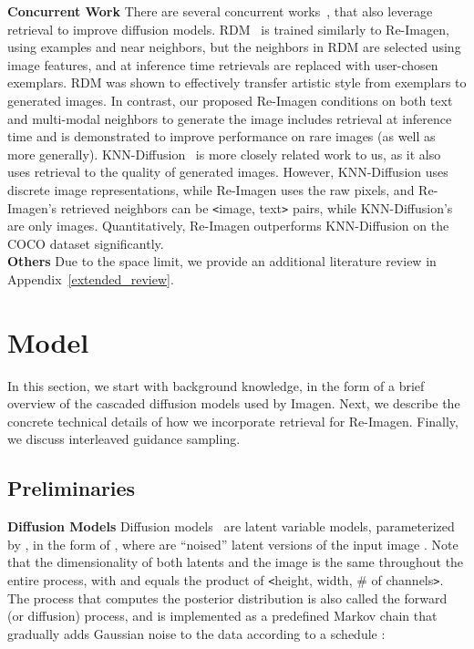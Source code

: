 \documentclass{article} \usepackage{iclr2023_conference,times}
\newcommand{\modelname}{{Re-Imagen}\xspace}
\begin{document}
\noindent \textbf{Concurrent Work} There are several concurrent works~\citep{li2022memory,blattmann2022retrieval,ashual2022knn}, that also leverage retrieval to improve diffusion models.  RDM~\citep{blattmann2022retrieval} is trained similarly to \modelname, using examples and near neighbors, but the neighbors in RDM are selected using image features, and at inference time retrievals are replaced with user-chosen exemplars. RDM was shown to effectively transfer artistic style from exemplars to generated images.  In contrast, our proposed \modelname conditions on both text and multi-modal neighbors to generate the image includes retrieval at inference time and is demonstrated to improve performance on rare images (as well as more generally).  KNN-Diffusion~\citep{ashual2022knn} is more closely related work to us, as it also uses retrieval to the quality of generated images. However, KNN-Diffusion uses discrete image representations, while \modelname uses the raw pixels, and \modelname's retrieved neighbors can be \texttt{<}image, text\texttt{>} pairs, while KNN-Diffusion's are only images. Quantitatively, \modelname{} outperforms  KNN-Diffusion on the COCO dataset significantly. \vspace{1ex}\\
\noindent \textbf{Others} Due to the space limit, we provide an additional literature review in Appendix~\ref{extended_review}.


\section{Model}

In this section, we start with background knowledge, in the form of a brief overview of the cascaded diffusion models used by Imagen. Next, we describe the concrete technical details of how we incorporate retrieval for \modelname. Finally, we discuss interleaved guidance sampling.

\subsection{Preliminaries}
\noindent \textbf{Diffusion Models}
Diffusion models~\citep{sohl2015deep} are latent variable models, parameterized by , in the form of , where  are ``noised'' latent versions of the input image . Note that the dimensionality of both latents and the image is the same throughout the entire process, with  and  equals the product of \texttt{<}height, width, \# of channels\texttt{>}. The process that computes the posterior distribution  is also called the forward (or diffusion) process, and is implemented as a predefined Markov chain that gradually adds Gaussian noise to the data according to a schedule :
\end{document}
